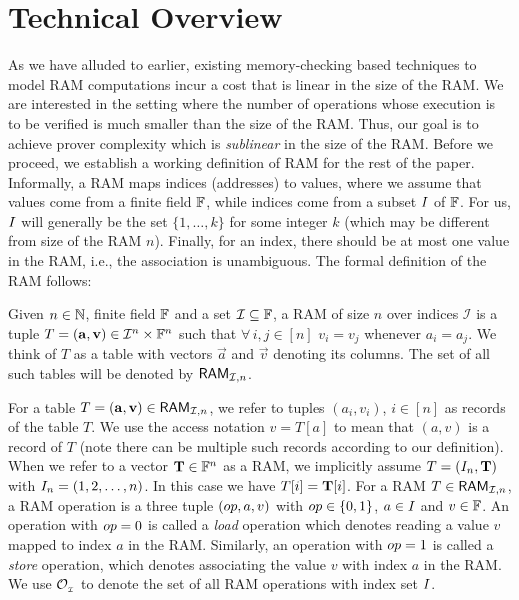 \section{Technical Overview}\label{sec:tech-overview}
As we have alluded to earlier, existing memory-checking based techniques to model RAM computations incur a cost
that is linear in the size of the RAM. We are interested in the setting where the number of operations whose
execution is to be verified is much smaller than the size of the RAM. Thus, our goal is to achieve prover complexity
which is {\em sublinear} in the size of the RAM. Before we proceed, we establish a
working definition of RAM for the rest of the paper. Informally, a RAM maps indices (addresses) to values, where
we assume that values come from a finite field $\mathbb{F}$, while indices come from a subset $I$ of $\mathbb{F}$. For us,
$I$ will generally be the set $\{1,\ldots,k\}$ for some integer $k$ (which may be different from size of
the RAM $n$). Finally, for an index, there should be at most one value in the RAM, i.e., the association is unambiguous.
The formal definition of the RAM follows:
\begin{definition}[RAM]\label{defn:RAM}
Given $n\in \mathbb{N}$, finite field $\mathbb{F}$ and a set $\mathcal{I}\subseteq \mathbb{F}$, a RAM of size $n$ over indices $\mathcal{I}$
is a tuple $T=(\mathbf{a},\mathbf{v})\in \mathcal{I}^n\times \mathbb{F}^n$ such that $\forall\, i,j\in [n]$  $v_i=v_j$ whenever $a_i=a_j$.
We think of $T$ as a table with vectors $\vec{a}$ and $\vec{v}$ denoting its columns. The set of all such
tables will be denoted by $\mathsf{RAM}_{\mathcal{I}, {n}}$.
\end{definition}
For a table $T=(\mathbf{a},\mathbf{v})\in \mathsf{RAM}_{\mathcal{I}, {n}}$, we refer to tuples $(a_i,v_i)$, $i\in [n]$ as records of the table $T$.
We use the access notation $v=T[a]$ to mean that $(a,v)$ is a record of $T$ (note there can be multiple such records
according to our definition). When we refer to a vector $\mathbf{T}\in \mathbb{F}^n$ as a RAM, we implicitly
assume $T=(I_n,\mathbf{T})$ with $I_n=(1,2,\ldots,n)$. In this case we have $T[i]=\mathbf{T}[i]$.
For a RAM $T\in \mathsf{RAM}_{\mathcal{I}, {n}}$, a RAM operation is a three tuple $({op},a,v)$ with ${op}\in \{0,1\}$,
$a\in I$ and $v\in \mathbb{F}$. An operation with ${op}=0$ is called a {\em load} operation which denotes reading a value $v$
mapped to index $a$ in the RAM. Similarly, an operation with ${op}=1$ is called a {\em store} operation,
which denotes associating the value $v$ with index $a$ in the RAM.
We use $\mathcal{O}_{{}_\mathcal{I}}$ to denote the set of all RAM operations with index set $I$.

